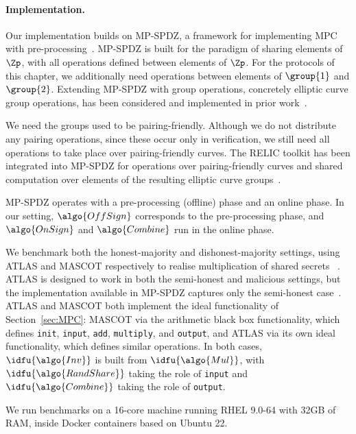 \paragraph{Implementation.} Our implementation builds on MP-SPDZ, a framework
for implementing MPC with pre-processing~\cite{CCS:Keller20}. MP-SPDZ is built for the paradigm of sharing elements of
$\Zp$, with all operations defined between elements of $\Zp$. For the
protocols of this chapter, we additionally need operations between elements
of $\group{1}$ and $\group{2}$. Extending MP-SPDZ with group operations,
concretely elliptic curve group operations, has been considered and
implemented in prior work~\cite{ESORICS:DOKSS20,NDSS:GPVRNC23}.

We need the groups used to be pairing-friendly. Although we do not distribute
any pairing operations, since these occur only in verification, we still need
all operations to take place over pairing-friendly curves. The RELIC toolkit
has been integrated into MP-SPDZ for operations over pairing-friendly curves
and shared computation over elements of the resulting elliptic curve
groups~\cite{NDSS:GPVRNC23,relictoolkit}.

MP-SPDZ operates with a pre-processing (offline) phase and an online phase.
In our setting, $\algo{OffSign}$ corresponds to the pre-processing phase, and
$\algo{OnSign}$ and $\algo{Combine}$ run in the online phase.

We benchmark both the honest-majority and dishonest-majority settings, using
ATLAS and MASCOT respectively to realise multiplication of shared secrets
~\cite{CCS:KelOrsSch16,C:GLOPS21}. ATLAS is designed to work in both the
semi-honest and malicious settings, but the implementation available in
MP-SPDZ captures only the semi-honest case~\cite{CCS:Keller20}. ATLAS and
MASCOT both implement the ideal functionality of Section~\ref{sec:MPC}:
MASCOT via the arithmetic black box functionality, which defines
\texttt{init}, \texttt{input}, \texttt{add}, \texttt{multiply}, and
\texttt{output}, and ATLAS via its own ideal functionality, which defines
similar operations. In both cases, $\idfu{\algo{Inv}}$ is built from $\idfu{\algo{Mul}}$, with
$\idfu{\algo{RandShare}}$ taking the role of \texttt{input} and $\idfu{\algo{Combine}}$ taking
the role of \texttt{output}.

We run benchmarks on a 16-core machine running RHEL 9.0-64 with 32GB of RAM,
inside Docker containers based on Ubuntu 22.

